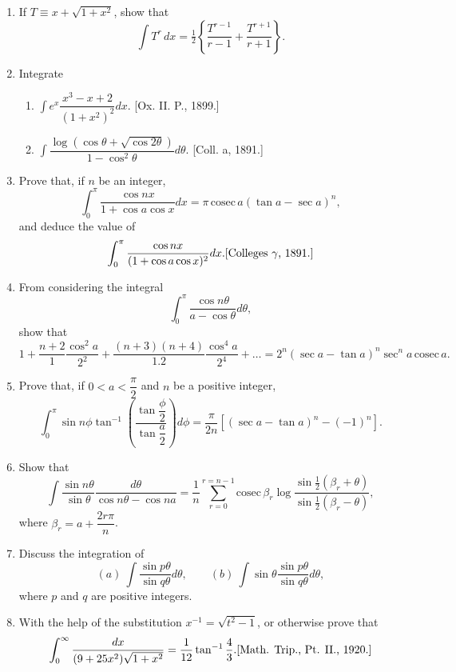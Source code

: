 \documentclass[11pt, a4paper]{article}
\newcommand{\source}[1]{\hfill\textnormal{[#1]}}
\begin{document}
\begin{enumerate}[leftmargin=2em]
\item If $T\equiv x+\sqrt{1+x^2}$, show that
\[
\int T^r\,dx = \tfrac12\left\{\dfrac{T^{r-1}}{r-1}+\dfrac{T^{r+1}}{r+1}\right\}.
\]

\item Integrate
\begin{enumerate}[label=(\roman*)]
\item $\displaystyle\int e^x\dfrac{x^3-x+2}{(1+x^2)^2}dx$. \source{Ox. II. P., 1899.}
\item $\displaystyle\int \dfrac{\log(\cos\theta+\sqrt{\cos2\theta})}{1-\cos^2\theta}d\theta$. \source{Coll. a, 1891.}
\end{enumerate}

\item Prove that, if $n$ be an integer,
\[
\int_0^\pi \dfrac{\cos nx}{1+\cos a\cos x}dx = \pi\,\text{cosec}\,a(\tan a-\sec a)^n,
\]
and deduce the value of
\[
\int_0^\pi \dfrac{\cos nx}{(1+\cos a\cos x)^2}dx. \source{Colleges $\gamma$, 1891.}
\]

\item From considering the integral
\[
\int_0^\pi \dfrac{\cos n\theta}{a-\cos\theta}d\theta,
\]
show that
\[
1+\dfrac{n+2}{1}\dfrac{\cos^2a}{2^2}+\dfrac{(n+3)(n+4)}{1.2}\dfrac{\cos^4a}{2^4}+\dots = 2^n(\sec a-\tan a)^n\sec^na\,\text{cosec}\,a.
\]

\item Prove that, if $0<a<\dfrac\pi2$ and $n$ be a positive integer,
\[
\int_0^\pi \sin n\phi\tan^{-1}\left(\dfrac{\tan\dfrac\phi2}{\tan\dfrac a2}\right)d\phi = \dfrac{\pi}{2n}\left[(\sec a-\tan a)^n-(-1)^n\right].
\]

\item Show that
\[
\int \dfrac{\sin n\theta}{\sin\theta}\dfrac{d\theta}{\cos n\theta-\cos na} = \dfrac1n\sum_{r=0}^{r=n-1}\text{cosec}\,\beta_r\log\dfrac{\sin\tfrac12(\beta_r+\theta)}{\sin\tfrac12(\beta_r-\theta)},
\]
where $\beta_r=a+\dfrac{2r\pi}{n}$.

\item Discuss the integration of
\[
(a)\ \int \dfrac{\sin p\theta}{\sin q\theta}d\theta, \qquad (b)\ \int \sin\theta\dfrac{\sin p\theta}{\sin q\theta}d\theta,
\]
where $p$ and $q$ are positive integers.

\item With the help of the substitution $x^{-1}=\sqrt{t^2-1}$, or otherwise prove that
\[
\int_0^\infty \dfrac{dx}{(9+25x^2)\sqrt{1+x^2}} = \dfrac{1}{12}\tan^{-1}\dfrac43. \source{Math. Trip., Pt. II., 1920.}
\]

\end{enumerate}
\end{document}

